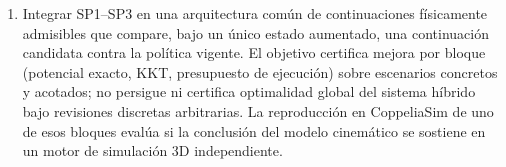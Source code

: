 \begin{enumerate}[
  label=\textbf{OE\arabic*.},
  leftmargin=3.4em,
  topsep=0.4em,
  itemsep=0.55em,
  parsep=0pt,
  start=6
]
  \item Integrar SP1--SP3 en una arquitectura común de continuaciones
  físicamente admisibles que compare, bajo un único estado aumentado, una
  continuación candidata contra la política vigente. El objetivo certifica
  mejora por bloque (potencial exacto, KKT, presupuesto de ejecución) sobre
  escenarios concretos y acotados; no persigue ni certifica optimalidad
  global del sistema híbrido bajo revisiones discretas arbitrarias. La
  reproducción en CoppeliaSim de uno de esos bloques evalúa si la conclusión
  del modelo cinemático se sostiene en un motor de simulación 3D
  independiente.
\end{enumerate}
